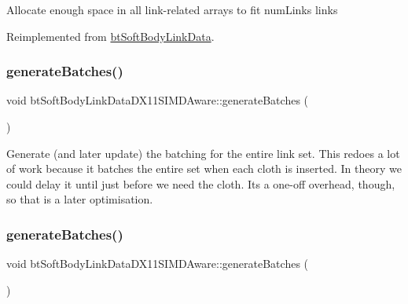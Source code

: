 Allocate enough space in all link-\/related arrays to fit num\+Links links 

Reimplemented from \hyperlink{classbtSoftBodyLinkData_a1713d14604037ca88d7915d627a32a13}{bt\+Soft\+Body\+Link\+Data}.

\mbox{\label{classbtSoftBodyLinkDataDX11SIMDAware_ac22f881862e6a2c2f7e57b8e50044827}} 
\subsubsection{\texorpdfstring{generate\+Batches()}{generateBatches()}\hspace{0.1cm}{\footnotesize\ttfamily [1/2]}}
{\footnotesize\ttfamily void bt\+Soft\+Body\+Link\+Data\+D\+X11\+S\+I\+M\+D\+Aware\+::generate\+Batches (\begin{DoxyParamCaption}{ }\end{DoxyParamCaption})}

Generate (and later update) the batching for the entire link set. This redoes a lot of work because it batches the entire set when each cloth is inserted. In theory we could delay it until just before we need the cloth. It\textquotesingle{}s a one-\/off overhead, though, so that is a later optimisation. \mbox{\label{classbtSoftBodyLinkDataDX11SIMDAware_ac22f881862e6a2c2f7e57b8e50044827}} 
\subsubsection{\texorpdfstring{generate\+Batches()}{generateBatches()}\hspace{0.1cm}{\footnotesize\ttfamily [2/2]}}
{\footnotesize\ttfamily void bt\+Soft\+Body\+Link\+Data\+D\+X11\+S\+I\+M\+D\+Aware\+::generate\+Batches (\begin{DoxyParamCaption}{ }\end{DoxyParamCaption})}

